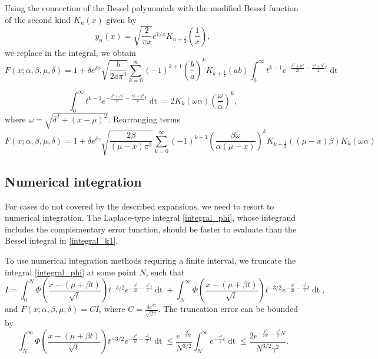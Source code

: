 \documentclass[10pt,a4paper,oneside]{article}
\numberwithin{equation}{section}
\begin{document}
Using the connection of the Bessel polynomials with the modified Bessel function of the second kind $K_n(x)$ given by
\begin{equation}
y_n(x) = \sqrt{\frac{2}{\pi x}}e^{1/x} K_{n + \frac{1}{2}}\left(\frac{1}{x}\right),
\end{equation}
we replace in the integral, we obtain
\begin{equation}
F(x; \alpha, \beta, \mu, \delta) = 1 + \delta e^{\delta \gamma} \sqrt{\frac{b}{2a\pi^3}}\sum_{k=0}^{\infty} (-1)^{k+1} \left(\frac{b}{a}\right)^k K_{k + \frac{1}{2}}(ab)\int_0^{\infty}t^{k-1} e^{-\frac{\delta^2 + a^2}{2t} -\frac{\gamma^2 + b^2}{2}t} \mathop{dt}
\end{equation}

\begin{equation}
\int_0^{\infty}t^{k-1} e^{-\frac{\delta^2 + a^2}{2t} -\frac{\gamma^2 + b^2}{2}t} \mathop{dt} = 2 K_k(\omega \alpha) \left(\frac{\omega}{\alpha}\right)^k,
\end{equation}
where $\omega = \sqrt{\delta^2 + (x-\mu)^2}$. Rearranging terms
\begin{equation}
F(x; \alpha, \beta, \mu, \delta) = 1 + \delta e^{\delta \gamma} \sqrt{\frac{2\beta}{(\mu-x)\pi^3}}\sum_{k=0}^{\infty} (-1)^{k+1} \left(\frac{\beta \omega}{\alpha(\mu-x)}\right)^k K_{k + \frac{1}{2}}((\mu-x)\beta) K_k(\omega \alpha) 
\end{equation}


\subsection{Numerical integration}
For cases do not covered by the described expansions, we need to resort to numerical integration. The Laplace-type integral \eqref{integral_phi}, whose integrand includes the complementary error function, should be faster to evaluate than the Bessel integral in \eqref{integral_k1}.

To use numerical integration methods requiring a finite interval, we truncate the integral \eqref{integral_phi} at some point $N$, such that
\begin{equation*}
I = \int_0^N \Phi\left(\frac{x - (\mu +\beta t)}{\sqrt{t}}\right) t^{-3/2} e^{-\frac{\delta^2}{2t} - \frac{\gamma^2}{2}t} \mathop{dt} + \int_N^{\infty} \Phi\left(\frac{x - (\mu +\beta t)}{\sqrt{t}}\right) t^{-3/2} e^{-\frac{\delta^2}{2t} - \frac{\gamma^2}{2}t} \mathop{dt},
\end{equation*}
and $F(x; \alpha, \beta, \mu, \delta) = C I$, where $C = \frac{\delta e^{\delta \gamma}}{\sqrt{2\pi}}$. The truncation error can be bounded by
\begin{equation*}
\int_N^{\infty} \Phi\left(\frac{x - (\mu +\beta t)}{\sqrt{t}}\right) t^{-3/2} e^{-\frac{\delta^2}{2t} - \frac{\gamma^2}{2}t} \mathop{dt} \le \frac{e^{-\frac{\delta^2}{2N}}}{N^{3/2}}\int_N^{\infty} e^{- \frac{\gamma^2}{2}t} \mathop{dt} \le \frac{2 e^{-\frac{\delta^2}{2N} - \frac{\gamma^2}{2}N}}{N^{3/2} \gamma^2}.
\end{equation*}
\end{document}
